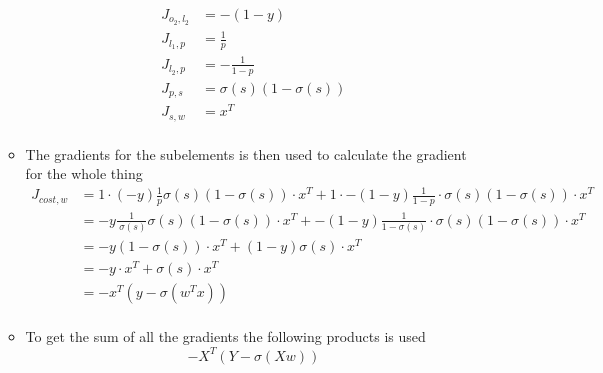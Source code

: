\documentclass[a4, english]{article}
\begin{document}
\begin{itemize}
\begin{itemize}
\begin{align*}
  J_{o_2, l_2} &= -(1-y) \\
    J_{l_1, p} &= \frac{1}{p}  \\
    J_{l_2, p} &= -\frac{1}{1-p} \\
    J_{p, s} &= \sigma(s)(1- \sigma(s)) \\
    J_{s, w} &= x^T \\
\end{align*}
  \item The gradients for the subelements is then used to calculate the gradient for the whole thing
\begin{align*}
  J_{cost,w} &= 1 \cdot (-y) \frac1p \sigma(s)(1- \sigma(s)) \cdot x^T + 1 \cdot -(1-y) \frac{1}{1-p} \cdot  \sigma(s)(1- \sigma(s)) \cdot x^T \\
            &= -y \frac1{\  \sigma(s)} \sigma(s)(1- \sigma(s)) \cdot x^T + -(1-y) \frac{1}{1- \sigma(s)} \cdot  \sigma(s)(1- \sigma(s)) \cdot x^T \\
            &= -y (1- \sigma(s)) \cdot x^T + (1-y) \sigma(s) \cdot x^T \\
            &= -y \cdot x^T + \sigma(s) \cdot x^T \\
            &= -x^T(y-\sigma(w^Tx)) \\    
\end{align*}
  \item To get the sum of all the gradients the following products is used
\begin{equation*}
  - X^T(Y-\sigma(Xw))
\end{equation*}

\end{itemize}

\end{itemize}
\end{document}
